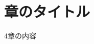 \documentclass[main]{subfiles}
\begin{document}
\section{章のタイトル}
4章の内容
\\
\\
\\
\\
\\
\\
\\
\\
\end{document}
